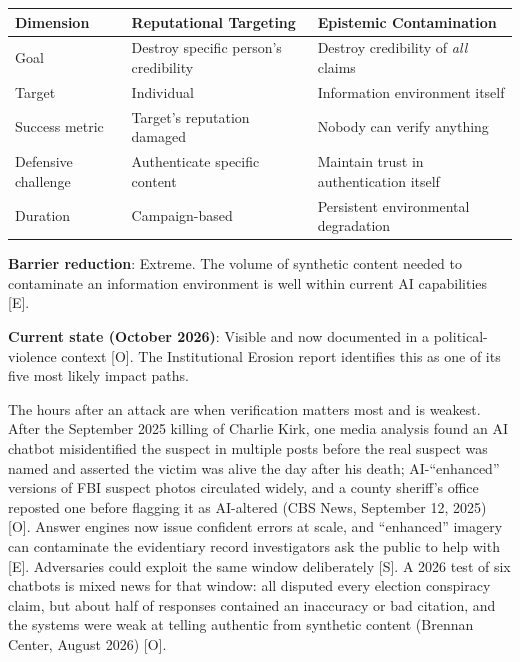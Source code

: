 \documentclass[11pt,letterpaper]{article}
\begin{document}
\begin{center}
\small
\begin{tabular}{L{3cm}L{4.5cm}L{4.5cm}}
\toprule
\textbf{Dimension} & \textbf{Reputational Targeting} & \textbf{Epistemic Contamination} \\
\midrule
Goal & Destroy specific person's credibility & Destroy credibility of \textit{all} claims \\
Target & Individual & Information environment itself \\
Success metric & Target's reputation damaged & Nobody can verify anything \\
Defensive challenge & Authenticate specific content & Maintain trust in authentication itself \\
Duration & Campaign-based & Persistent environmental degradation \\
\bottomrule
\end{tabular}
\end{center}

\textbf{Barrier reduction}: Extreme. The volume of synthetic content needed to contaminate an information environment is well within current AI capabilities [E].

\textbf{Current state (October 2026)}: Visible and now documented in a political-violence context [O]. The Institutional Erosion report identifies this as one of its five most likely impact paths.

\begin{warnbox}
The hours after an attack are when verification matters most and is weakest. After the September 2025 killing of Charlie Kirk, one media analysis found an AI chatbot misidentified the suspect in multiple posts before the real suspect was named and asserted the victim was alive the day after his death; AI-``enhanced'' versions of FBI suspect photos circulated widely, and a county sheriff's office reposted one before flagging it as AI-altered (CBS News, September 12, 2025) [O]. Answer engines now issue confident errors at scale, and ``enhanced'' imagery can contaminate the evidentiary record investigators ask the public to help with [E]. Adversaries could exploit the same window deliberately [S]. A 2026 test of six chatbots is mixed news for that window: all disputed every election conspiracy claim, but about half of responses contained an inaccuracy or bad citation, and the systems were weak at telling authentic from synthetic content (Brennan Center, August 2026) [O].
\end{warnbox}
\end{document}
